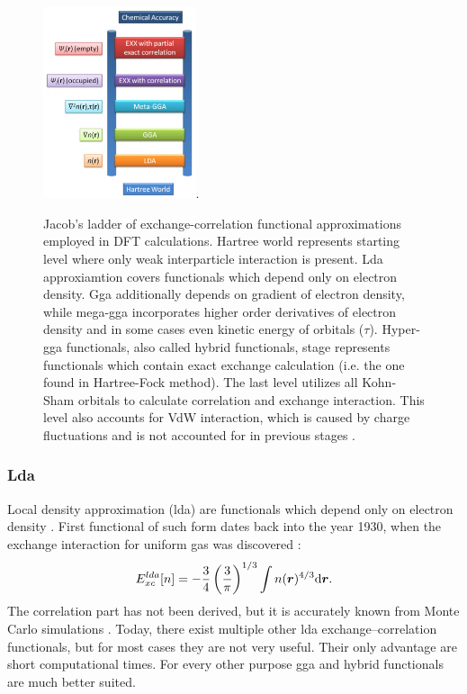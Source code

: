 \documentclass[openany, longbibliography,slovene,a4paper,12pt]{article}
\def\vec#1{\mbox{\boldmath$#1$}}
\newcommand{\dif}{\mathrm{d}}
\begin{document}
\begin{figure}[!ht
  ]
  \centering
  \includegraphics[width=0.4\textwidth]{jacobs_functional_ladder_ver2.png}.
  \caption{Jacob’s ladder of exchange-correlation functional approximations
    employed in DFT calculations. Hartree world represents starting level where only
    weak interparticle interaction is present. Lda approxiamtion covers
    functionals which depend only on electron density. Gga additionally depends
    on gradient of electron density, while mega-gga incorporates higher order
    derivatives of electron density and in some cases even kinetic energy of
    orbitals ($\tau$). Hyper-gga functionals, also called hybrid functionals,
    stage represents functionals which contain exact exchange calculation (i.e.
    the one found in Hartree-Fock method). The last level utilizes all Kohn-Sham
    orbitals to calculate correlation and exchange interaction. This level also
    accounts for VdW interaction, which is caused by charge fluctuations and is
    not accounted for in previous stages \cite{How_theo_simul_can_address}.
  }
  \label{ladder}
\end{figure}

\subsubsection{Lda}
Local density approximation (lda) are functionals which depend only on
 electron density \cite{challenges_den_fun_theor, presc_desig_selec_densit_funct_approx}.
First functional of such form dates back into
the year 1930, when the exchange interaction for uniform gas was discovered
\cite{challenges_den_fun_theor} :
\begin{equation} \label{electron_gas_exchange}
E_{xc}^{lda}[n]=-\frac{3}{4}\left( \frac{3}{\pi} \right)^{1/3}\int n(\vec r)^{4/3} \dif \vec r.
\end{equation}
The correlation part has not been derived, but it is accurately known from Monte
Carlo simulations \cite{presc_desig_selec_densit_funct_approx}.
Today, there exist multiple other lda exchange--correlation functionals, but for most cases
they are not very useful. Their only advantage are short computational times.
For every other purpose gga and hybrid functionals are much better suited.
\end{document}
